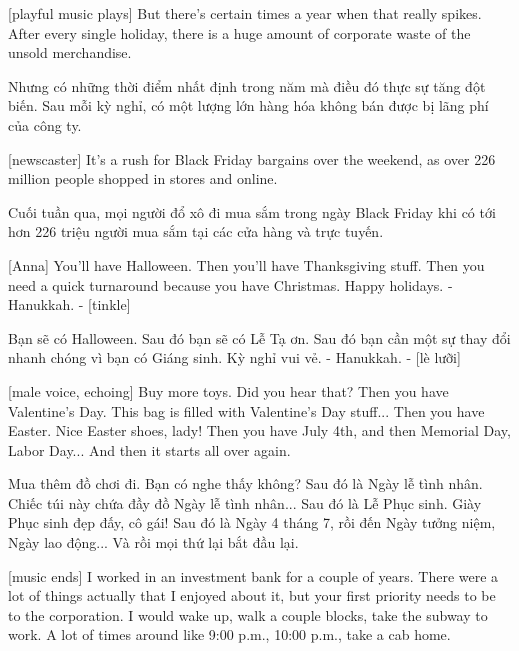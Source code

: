 \documentclass[a4paper]{article}
\begin{document}
	[playful music plays]
	But there's certain times a year when that really spikes.
	After every single holiday, there is a huge amount of corporate waste of the unsold merchandise.
	
	\begin{vietnamese-v2}
		Nhưng có những thời điểm nhất định trong năm mà điều đó thực sự tăng đột biến.
		Sau mỗi kỳ nghỉ, có một lượng lớn hàng hóa không bán được bị lãng phí của công ty.
	\end{vietnamese-v2}
	
	[newscaster] It's a rush for Black Friday bargains over the weekend, as over 226 million people shopped in stores and online.
	
	\begin{vietnamese-v2}
		 Cuối tuần qua, mọi người đổ xô đi mua sắm trong ngày Black Friday khi có tới hơn 226 triệu người mua sắm tại các cửa hàng và trực tuyến.
	\end{vietnamese-v2}
	
	[Anna] You'll have Halloween.
	Then you'll have Thanksgiving stuff.
	Then you need a quick turnaround because you have Christmas.
	Happy holidays.
	- Hanukkah. - [tinkle]
	
	\begin{vietnamese-v2}
		[Anna] Bạn sẽ có Halloween.
		Sau đó bạn sẽ có Lễ Tạ ơn.
		Sau đó bạn cần một sự thay đổi nhanh chóng vì bạn có Giáng sinh.
		Kỳ nghỉ vui vẻ.
		- Hanukkah. - [lè lưỡi]
	\end{vietnamese-v2}
	
	[male voice, echoing] Buy more toys.
	Did you hear that?
	Then you have Valentine's Day.
	This bag is filled with Valentine's Day stuff...
	Then you have Easter.
	Nice Easter shoes, lady!
	Then you have July 4th, and then Memorial Day, Labor Day...
	And then it starts all over again.
	
	\begin{vietnamese-v2}
		 Mua thêm đồ chơi đi.
		Bạn có nghe thấy không?
		Sau đó là Ngày lễ tình nhân.
		Chiếc túi này chứa đầy đồ Ngày lễ tình nhân...
		Sau đó là Lễ Phục sinh.
		Giày Phục sinh đẹp đấy, cô gái!
		Sau đó là Ngày 4 tháng 7, rồi đến Ngày tưởng niệm, Ngày lao động...
		Và rồi mọi thứ lại bắt đầu lại.	
	\end{vietnamese-v2}
	
	[music ends]
	I worked in an investment bank for a couple of years.
	There were a lot of things actually that I enjoyed about it, but your first priority needs to be to the corporation.
	I would wake up, walk a couple blocks, take the subway to work.
	A lot of times around like 9:00 p.m., 10:00 p.m., take a cab home.
	
\end{document}
